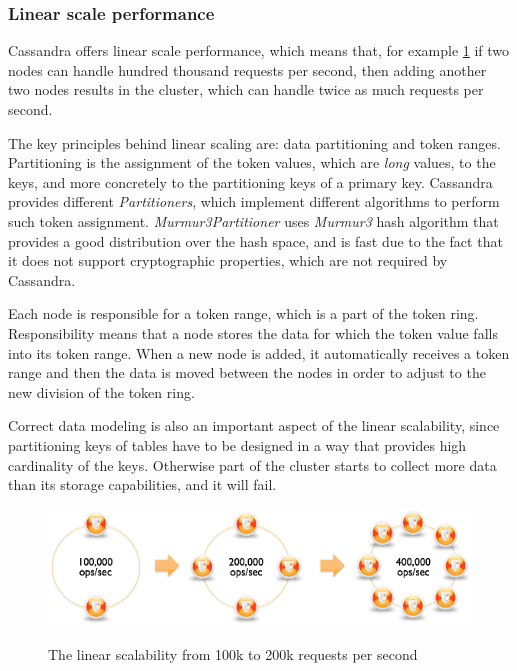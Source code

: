 
\subsubsection{Linear scale performance}
\label{sec:theory:cassandra:linear}
Cassandra offers linear scale performance, which means that, for example \ref{fig:archLinearScale} if two nodes can handle hundred thousand requests per second, then adding another two nodes results in the cluster, which can handle twice as much requests per second. 

The key principles behind linear scaling are:  data partitioning and token ranges. 
Partitioning is the assignment of the token values, which are \emph{long} values, to the keys, and more concretely to the partitioning keys of a primary key. Cassandra provides different \emph{Partitioners}, which implement different algorithms to perform such token assignment. \emph{Murmur3Partitioner} uses \emph{Murmur3} hash algorithm that provides a good distribution over the hash space, and is fast due to the fact that it does not support cryptographic properties, which are not required by Cassandra.

Each node is responsible for a token range, which is a part of the token ring. Responsibility means that a node stores the data for which the token value falls into its token range. When a new node is added, it automatically receives a token range and then the data is moved between the nodes in order to adjust to the new division of the token ring.

Correct data modeling is also an important aspect of the linear scalability, since partitioning keys of tables have to be designed in a way that provides high cardinality of the keys. Otherwise part of the cluster starts to collect more data than its storage capabilities, and it will fail. 


\begin{figure}[H]
  \centering  
  \includegraphics[width=\textwidth]{images/cassandra-linear-scalability.png}\hspace{10mm}
  \label{fig:archLinearScale}
  \caption{The linear scalability from 100k to 200k requests per second}
\end{figure}


